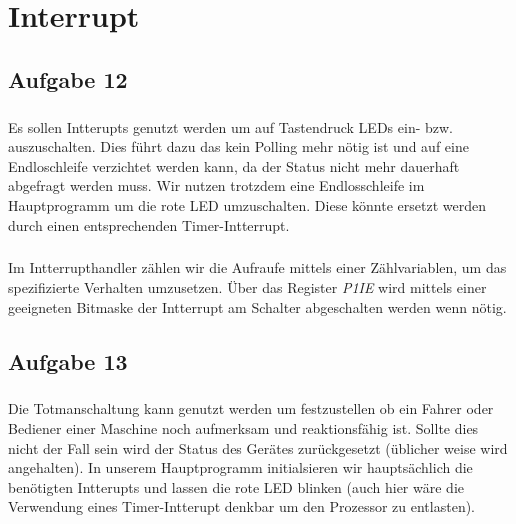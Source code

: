 \chapter{Interrupt}

\section*{Aufgabe 12}

\paragraph*{}
Es sollen Intterupts genutzt werden um auf Tastendruck LEDs ein- bzw. auszuschalten. Dies führt dazu das kein Polling mehr nötig ist und auf eine Endloschleife verzichtet werden kann, da der Status nicht mehr dauerhaft abgefragt werden muss. Wir nutzen trotzdem eine Endlosschleife im Hauptprogramm um die rote LED umzuschalten. Diese könnte ersetzt werden durch einen entsprechenden Timer-Intterrupt. \\



\paragraph*{}
Im Intterrupthandler zählen wir die Aufraufe mittels einer Zählvariablen, um das spezifizierte Verhalten umzusetzen. Über das Register {\em P1IE} wird mittels einer geeigneten Bitmaske der Intterrupt am Schalter abgeschalten werden wenn nötig. \\ 



\section*{Aufgabe 13}

\paragraph*{}
Die Totmanschaltung kann genutzt werden um festzustellen ob ein Fahrer oder Bediener einer Maschine noch aufmerksam und reaktionsfähig ist. Sollte dies nicht der Fall sein wird der Status des Gerätes zurückgesetzt (üblicher weise wird angehalten). In unserem Hauptprogramm initialsieren wir hauptsächlich die benötigten Intterupts und lassen die rote LED blinken (auch hier wäre die Verwendung eines Timer-Intterupt denkbar um den Prozessor zu entlasten). \\ 

